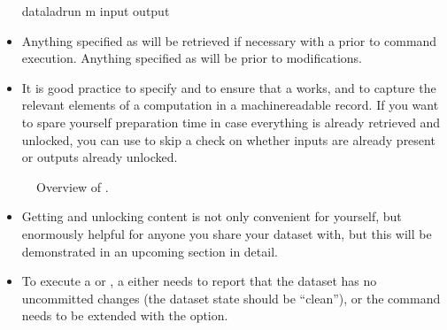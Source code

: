 \begin{itemize}
\begin{sphinxVerbatim}[commandchars=\\\{\}]
dataladrun
\PYGZhy{}m
\PYGZhy{}\PYGZhy{}input
\PYGZhy{}\PYGZhy{}output
\end{sphinxVerbatim}

\item {} 
\sphinxAtStartPar
Anything specified as  will be retrieved if necessary with a  prior to command
execution. Anything specified as  will be  prior to modifications.

\item {} 
\sphinxAtStartPar
It is good practice to specify  and  to ensure that a  works, and to capture the relevant elements of a computation in a machine\sphinxhyphen{}readable record.
If you want to spare yourself preparation time in case everything is already retrieved and unlocked, you can use  to skip a check on whether inputs are already present or outputs already unlocked.

\end{itemize}

\begin{figure}[tbp]
\centering
\capstart

\noindent{}
\caption{Overview of .}\label{\detokenize{basics/101-113-summary:id1}}\label{\detokenize{basics/101-113-summary:fig-run-schema}}\end{figure}
\begin{itemize}
\item {} 
\sphinxAtStartPar
Getting and unlocking content is not only convenient for yourself, but enormously helpful
for anyone you share your dataset with, but this will be demonstrated in an upcoming section
in detail.

\item {} 
\sphinxAtStartPar
To execute a  or , a 
either needs to report that the dataset has no uncommitted changes (the dataset state
should be “clean”), or the command needs to be extended with the  option.

\end{itemize}


